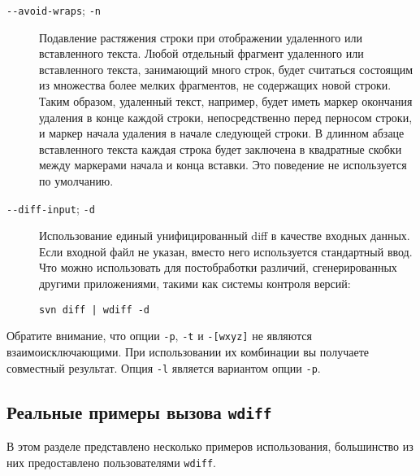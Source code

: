 \begin{description}
\item[\texttt{-\/-avoid-wraps}; \texttt{-n}]
Подавление растяжения строки при отображении удаленного или вставленного
текста. Любой отдельный фрагмент удаленного или вставленного текста,
занимающий много строк, будет считаться состоящим из множества более
мелких фрагментов, не содержащих новой строки. Таким образом, удаленный
текст, например, будет иметь маркер окончания удаления в конце каждой
строки, непосредственно перед перносом строки, и маркер начала удаления
в начале следующей строки. В длинном абзаце вставленного текста каждая
строка будет заключена в квадратные скобки между маркерами начала и
конца вставки. Это поведение не используется по умолчанию.
\item[\texttt{-\/-diff-input}; \texttt{-d}]
Использование единый унифицированный diff в качестве входных данных.
Если входной файл не указан, вместо него используется стандартный ввод.
Что можно использовать для постобработки различий, сгенерированных
другими приложениями, такими как системы контроля версий:

\begin{verbatim}
svn diff | wdiff -d
\end{verbatim}
\end{description}

Обратите внимание, что опции \texttt{-p}, \texttt{-t} и
\texttt{-{[}wxyz{]}} не являются взаимоисключающими. При использовании
их комбинации вы получаете совместный результат. Опция \texttt{-l}
является вариантом опции \texttt{-p}.

\hypertarget{_041f_0440_0438_043c_0435_0440_044b-_0432_044b_0437_043e_0432_0430-wdiff}{%
\subsection{\texorpdfstring{Реальные примеры вызова
\texttt{wdiff}}{Реальные примеры вызова wdiff}}\label{_041f_0440_0438_043c_0435_0440_044b-_0432_044b_0437_043e_0432_0430-wdiff}}

В этом разделе представлено несколько примеров использования,
большинство из них предоставлено пользователями \texttt{wdiff}.

